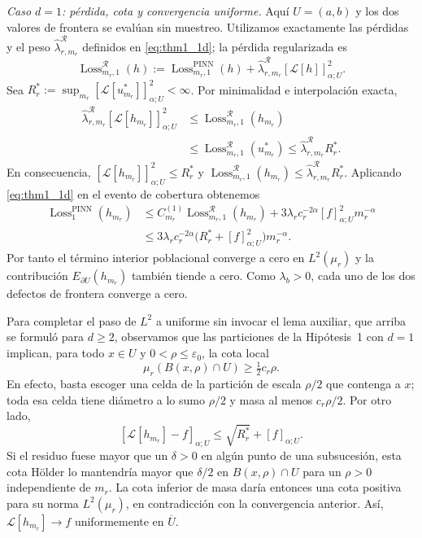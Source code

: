 \medskip
\noindent\emph{Caso $d=1$: pérdida, cota y convergencia uniforme.}
Aquí $U=(a,b)$ y los dos valores de frontera se evalúan sin muestreo. Utilizamos
exactamente las pérdidas y el peso $\widehat\lambda_{r,m_r}^{\mathcal R}$
definidos en \eqref{eq:thm1_1d}; la pérdida regularizada es
\[
\operatorname{Loss}^{\mathcal R}_{m_r,1}(h)
:=\operatorname{Loss}^{\mathrm{PINN}}_{m_r,1}(h)
 +\widehat\lambda_{r,m_r}^{\mathcal R}
  [\mathcal L[h]]_{\alpha;U}^2.
\]
Sea $R_r^*:=\sup_{m_r}[\mathcal L[u_{m_r}^*]]_{\alpha;U}^2<\infty$.
Por minimalidad e interpolación exacta,
\[
\begin{aligned}
\widehat\lambda_{r,m_r}^{\mathcal R}
 [\mathcal L[h_{m_r}]]_{\alpha;U}^2
&\leq \operatorname{Loss}^{\mathcal R}_{m_r,1}(h_{m_r})\\
&\leq \operatorname{Loss}^{\mathcal R}_{m_r,1}(u_{m_r}^*)
\leq \widehat\lambda_{r,m_r}^{\mathcal R}R_r^*.
\end{aligned}
\]
En consecuencia,
$[\mathcal L[h_{m_r}]]_{\alpha;U}^2\leq R_r^*$ y
$\operatorname{Loss}^{\mathcal R}_{m_r,1}(h_{m_r})
\leq\widehat\lambda_{r,m_r}^{\mathcal R}R_r^*$.
Aplicando \eqref{eq:thm1_1d} en el evento de cobertura obtenemos
\[
\begin{aligned}
\operatorname{Loss}^{\mathrm{PINN}}_{1}(h_{m_r})
&\leq C_{m_r}^{(1)}\operatorname{Loss}^{\mathcal R}_{m_r,1}(h_{m_r})
+3\lambda_r c_r^{-2\alpha}[f]_{\alpha;U}^{2}m_r^{-\alpha}\\
&\leq 3\lambda_r c_r^{-2\alpha}
\bigl(R_r^*+[f]_{\alpha;U}^{2}\bigr)m_r^{-\alpha}.
\end{aligned}
\]
Por tanto el término interior poblacional converge a cero en $L^2(\mu_r)$
y la contribución $E_{\partial U}(h_{m_r})$ también tiende a cero.
Como $\lambda_b>0$, cada uno de los dos defectos de frontera converge a cero.

Para completar el paso de $L^2$ a uniforme sin invocar el lema auxiliar,
que arriba se formuló para $d\geq2$, observamos que las particiones de
la Hipótesis~1 con $d=1$ implican, para todo $x\in U$ y
$0<\rho\leq\varepsilon_0$, la cota local
\[
\mu_r(B(x,\rho)\cap U)\geq \tfrac12c_r\rho.
\]
En efecto, basta escoger una celda de la partición de escala $\rho/2$
que contenga a $x$; toda esa celda tiene diámetro a lo sumo $\rho/2$
y masa al menos $c_r\rho/2$. Por otro lado,
\[
[\mathcal L[h_{m_r}]-f]_{\alpha;U}
\leq \sqrt{R_r^*}+[f]_{\alpha;U}.
\]
Si el residuo fuese mayor que un $\delta>0$ en algún punto de una
subsucesión, esta cota Hölder lo mantendría mayor que $\delta/2$ en
$B(x,\rho)\cap U$ para un $\rho>0$ independiente de $m_r$.
La cota inferior de masa daría entonces una cota positiva para su norma
$L^2(\mu_r)$, en contradicción con la convergencia anterior.
Así, $\mathcal L[h_{m_r}]\to f$ uniformemente en $\overline U$.

